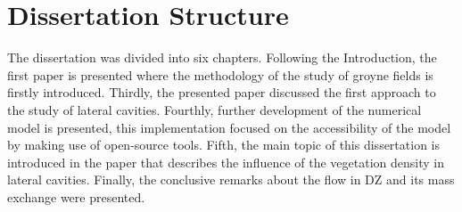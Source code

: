 \section{Dissertation Structure}
The dissertation was divided into six chapters. Following the Introduction, the first paper is presented where the methodology of the study of groyne fields is firstly introduced. Thirdly, the presented paper discussed the first approach to the study of lateral cavities. Fourthly, further development of the numerical model is presented, this implementation focused on the accessibility of the model by making use of open-source tools. Fifth, the main topic of this dissertation is introduced in the paper that describes the influence of the vegetation density in lateral cavities. Finally, the conclusive remarks about the flow in DZ and its mass exchange were presented.

